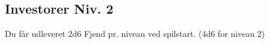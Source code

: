 \subsection*{Investorer Niv. 2}
Du får udleveret 2d6 Fjend pr. niveau ved spilstart. (4d6 for niveau 2)\\